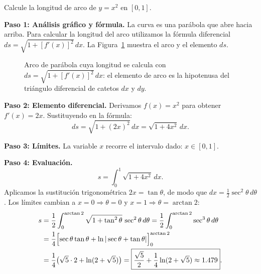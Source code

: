 \begin{example}
Calcule la longitud de arco de $y=x^2$ en $[0,1]$.

\begin{myproof}
\textbf{Paso 1: Análisis gráfico y fórmula.}
La curva es una parábola que abre hacia arriba. Para calcular la longitud del arco
utilizamos la fórmula diferencial $ds = \sqrt{1+[f'(x)]^2}\,dx$.
La Figura~\ref{fig:longitud_parabola} muestra el arco y el elemento $ds$.

\begin{figure}[H]
\centering
\caption{Arco de parábola cuya longitud se calcula con $ds=\sqrt{1+[f'(x)]^2}\,dx$: el elemento de arco es la hipotenusa del triángulo diferencial de catetos $dx$ y $dy$.}
\label{fig:longitud_parabola}
\end{figure}

\textbf{Paso 2: Elemento diferencial.}
Derivamos $f(x)=x^2$ para obtener $f'(x)=2x$. Sustituyendo en la fórmula:
\[ ds = \sqrt{1+(2x)^2}\,dx = \sqrt{1+4x^2}\,dx. \]

\textbf{Paso 3: Límites.}
La variable $x$ recorre el intervalo dado: $x\in[0,1]$.

\textbf{Paso 4: Evaluación.}
\[ s = \int_0^1 \sqrt{1+4x^2}\,dx. \]
Aplicamos la sustitución trigonométrica $2x=\tan\theta$, de modo que
$dx=\frac{1}{2}\sec^2\theta\,d\theta$. Los límites cambian a
$x=0\Rightarrow\theta=0$ y $x=1\Rightarrow\theta=\arctan 2$:
\begin{align*}
  s &= \frac{1}{2}\int_0^{\arctan 2}\sqrt{1+\tan^2\theta}\,\sec^2\theta\,d\theta
     = \frac{1}{2}\int_0^{\arctan 2}\sec^3\theta\,d\theta \\
    &= \frac{1}{4}\Bigl[\sec\theta\tan\theta+\ln|\sec\theta+\tan\theta|\Bigr]_0^{\arctan 2} \\
    &= \frac{1}{4}\bigl(\sqrt{5}\cdot 2+\ln(2+\sqrt{5})\bigr)
     = \boxed{\dfrac{\sqrt{5}}{2}+\dfrac{1}{4}\ln(2+\sqrt{5})\approx 1.479}.
\end{align*}
\end{myproof}
\end{example}

